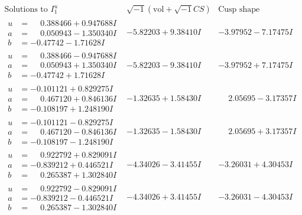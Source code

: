 \documentclass[1p]{elsarticle_modified}
\theoremstyle{definition}
\newcommand{\I}{\sqrt{-1}}
\begin{document}
$$\begin{array}{c|c|c}  
\text{Solutions to }I^u_{1}& \I (\text{vol} + \sqrt{-1}CS) & \text{Cusp shape}\\
 \hline 
\begin{aligned}
u &= \phantom{-}0.388466 + 0.947688 I \\
a &= \phantom{-}0.050943 - 1.350340 I \\
b &= -0.47742 - 1.71628 I\end{aligned}
 & -5.82203 + 9.38410 I & -3.97952 - 7.17475 I \\ \hline\begin{aligned}
u &= \phantom{-}0.388466 - 0.947688 I \\
a &= \phantom{-}0.050943 + 1.350340 I \\
b &= -0.47742 + 1.71628 I\end{aligned}
 & -5.82203 - 9.38410 I & -3.97952 + 7.17475 I \\ \hline\begin{aligned}
u &= -0.101121 + 0.829275 I \\
a &= \phantom{-}0.467120 + 0.846136 I \\
b &= -0.108197 + 1.248190 I\end{aligned}
 & -1.32635 + 1.58430 I & \phantom{-}2.05695 - 3.17357 I \\ \hline\begin{aligned}
u &= -0.101121 - 0.829275 I \\
a &= \phantom{-}0.467120 - 0.846136 I \\
b &= -0.108197 - 1.248190 I\end{aligned}
 & -1.32635 - 1.58430 I & \phantom{-}2.05695 + 3.17357 I \\ \hline\begin{aligned}
u &= \phantom{-}0.922792 + 0.829091 I \\
a &= -0.839212 + 0.446521 I \\
b &= \phantom{-}0.265387 + 1.302840 I\end{aligned}
 & -4.34026 - 3.41455 I & -3.26031 + 4.30453 I \\ \hline\begin{aligned}
u &= \phantom{-}0.922792 - 0.829091 I \\
a &= -0.839212 - 0.446521 I \\
b &= \phantom{-}0.265387 - 1.302840 I\end{aligned}
 & -4.34026 + 3.41455 I & -3.26031 - 4.30453 I \\ \hline\begin{aligned}

\end{aligned}
\end{array}$$
\end{document}
